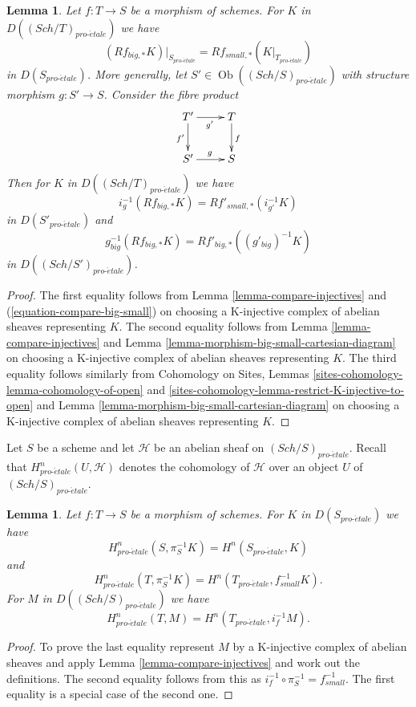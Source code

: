 \documentclass{stacks-project}
\theoremstyle{plain}
\newtheorem{lemma}[subsection]{Lemma}
\theoremstyle{definition}
\theoremstyle{remark}
\numberwithin{equation}{subsection}
\def\Sch{\mathit{Sch}}
\def\Ob{\mathop{\mathrm{Ob}}\nolimits}
\def\proetale{{pro\text{-}\acute{e}tale}}
\begin{document}
\begin{lemma}
\label{lemma-compare-higher-direct-image}
Let $f : T \to S$ be a morphism of schemes.
For $K$ in $D((\Sch/T)_\proetale)$ we have
$$
(Rf_{big, *}K)|_{S_\proetale} = Rf_{small, *}(K|_{T_\proetale})
$$
in $D(S_\proetale)$. More generally, let $S' \in \Ob((\Sch/S)_\proetale)$
with structure morphism $g : S' \to S$. Consider the fibre product
$$
\xymatrix{
T' \ar[r]_{g'} \ar[d]_{f'} & T \ar[d]^f \\
S' \ar[r]^g & S
}
$$
Then for $K$ in $D((\Sch/T)_\proetale)$ we have
$$
i_g^{-1}(Rf_{big, *}K) = Rf'_{small, *}(i_{g'}^{-1}K)
$$
in $D(S'_\proetale)$ and
$$
g_{big}^{-1}(Rf_{big, *}K) = Rf'_{big, *}((g'_{big})^{-1}K)
$$
in $D((\Sch/S')_\proetale)$.
\end{lemma}

\begin{proof}
The first equality follows from Lemma \ref{lemma-compare-injectives}
and (\ref{equation-compare-big-small})
on choosing a K-injective complex of abelian sheaves representing $K$.
The second equality follows from Lemma \ref{lemma-compare-injectives}
and Lemma
\ref{lemma-morphism-big-small-cartesian-diagram}
on choosing a K-injective complex of abelian sheaves representing $K$.
The third equality follows similarly from
Cohomology on Sites, Lemmas \ref{sites-cohomology-lemma-cohomology-of-open} and
\ref{sites-cohomology-lemma-restrict-K-injective-to-open}
and Lemma \ref{lemma-morphism-big-small-cartesian-diagram}
on choosing a K-injective complex of abelian sheaves representing $K$.
\end{proof}

\noindent
Let $S$ be a scheme and let $\mathcal{H}$ be an abelian sheaf on
$(\Sch/S)_\proetale$. Recall that $H^n_\proetale(U, \mathcal{H})$ denotes
the cohomology of $\mathcal{H}$ over an object $U$ of $(\Sch/S)_\proetale$.

\begin{lemma}
\label{lemma-compare-cohomology-big-small}
Let $f : T \to S$ be a morphism of schemes. For $K$ in $D(S_\proetale)$
we have
$$
H^n_\proetale(S, \pi_S^{-1}K) = H^n(S_\proetale, K)
$$
and
$$
H^n_\proetale(T, \pi_S^{-1}K) = H^n(T_\proetale, f_{small}^{-1}K).
$$
For $M$ in $D((\Sch/S)_\proetale)$ we have
$$
H^n_\proetale(T, M) = H^n(T_\proetale, i_f^{-1}M).
$$
\end{lemma}

\begin{proof}
To prove the last equality represent $M$
by a K-injective complex of abelian sheaves
and apply Lemma \ref{lemma-compare-injectives}
and work out the definitions. The second equality follows from
this as $i_f^{-1} \circ \pi_S^{-1} = f_{small}^{-1}$. The first
equality is a special
case of the second one.
\end{proof}
\end{document}
